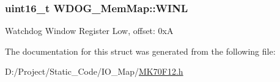 \subsubsection[{W\+I\+N\+L}]{\setlength{\rightskip}{0pt plus 5cm}uint16\+\_\+t W\+D\+O\+G\+\_\+\+Mem\+Map\+::\+W\+I\+N\+L}\label{struct_w_d_o_g___mem_map_af238938251c1f5904a215c8a4ed1b74d}
Watchdog Window Register Low, offset\+: 0x\+A 

The documentation for this struct was generated from the following file\+:\begin{DoxyCompactItemize}
\item 
D\+:/\+Project/\+Static\+\_\+\+Code/\+I\+O\+\_\+\+Map/\hyperlink{_m_k70_f12_8h}{M\+K70\+F12.\+h}\end{DoxyCompactItemize}
